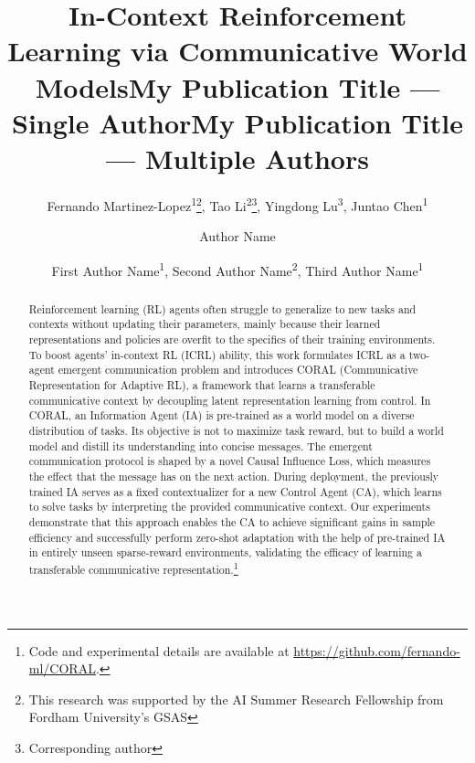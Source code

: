 \documentclass[letterpaper]{article} %
\title{In-Context Reinforcement Learning via Communicative World Models}
\author{
    Fernando Martinez-Lopez\textsuperscript{\rm 1}\thanks{This research was supported by the AI Summer Research Fellowship from Fordham University's GSAS}, Tao Li\textsuperscript{\rm 2}\thanks{Corresponding author}, Yingdong Lu\textsuperscript{\rm 3}, Juntao Chen\textsuperscript{\rm 1}
}
\title{My Publication Title --- Single Author}
\author {
    Author Name
}
\title{My Publication Title --- Multiple Authors}
\author {
    First Author Name\textsuperscript{\rm 1},
    Second Author Name\textsuperscript{\rm 2},
    Third Author Name\textsuperscript{\rm 1}
}
\begin{document}
\maketitle

\begin{abstract}
Reinforcement learning (RL) agents often struggle to generalize to new tasks and contexts without updating their parameters, mainly because their learned representations and policies are overfit to the specifics of their training environments. To boost agents' in-context RL (ICRL) ability, this work formulates ICRL as a two-agent emergent communication problem and introduces CORAL (Communicative Representation for Adaptive RL), a framework that learns a transferable communicative context by decoupling latent representation learning from control. In CORAL, an Information Agent (IA) is pre-trained as a world model on a diverse distribution of tasks. Its objective is not to maximize task reward, but to build a world model and distill its understanding into concise messages. The emergent communication protocol is shaped by a novel Causal Influence Loss, which measures the effect that the message has on the next action. During deployment, the previously trained IA serves as a fixed contextualizer for a new Control Agent (CA), which learns to solve tasks by interpreting the provided communicative context. Our experiments demonstrate that this approach enables the CA to achieve significant gains in sample efficiency and successfully perform zero-shot adaptation with the help of pre-trained IA in entirely unseen sparse-reward environments, validating the efficacy of learning a transferable communicative representation.\footnote{Code and experimental details are available at \url{https://github.com/fernando-ml/CORAL}.}

\end{abstract}
\end{document}
